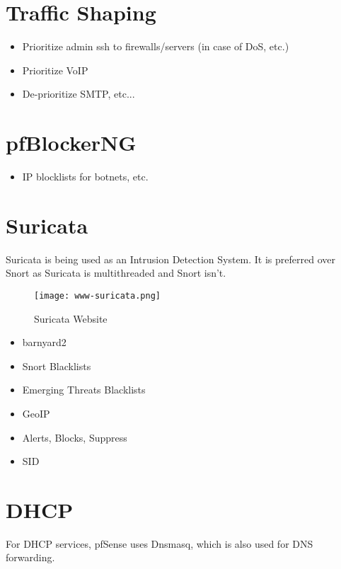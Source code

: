 \section{Traffic Shaping}
\begin{itemize}
 \item Prioritize admin ssh to firewalls/servers (in case of DoS, etc.)
 \item Prioritize VoIP
 \item De-prioritize SMTP, etc...
\end{itemize}

\section{pfBlockerNG}
\begin{itemize}
 \item IP blocklists for botnets, etc.
\end{itemize}


\section{Suricata}
Suricata is being used as an Intrusion Detection System.
It is preferred over Snort as Suricata is multithreaded and Snort isn't.

\begin{figure}[h!]
\begin{center}
\texttt{[image: www-suricata.png]}
 \caption{Suricata Website}
 \label{fig:www-suricata}
\end{center}
\end{figure}

\begin{itemize}
 \item barnyard2
 \item Snort Blacklists
 \item Emerging Threats Blacklists
 \item GeoIP
 \item Alerts, Blocks, Suppress
 \item SID
\end{itemize}


\section{DHCP}
For DHCP services, pfSense uses Dnsmasq, which is also used for DNS
forwarding.


